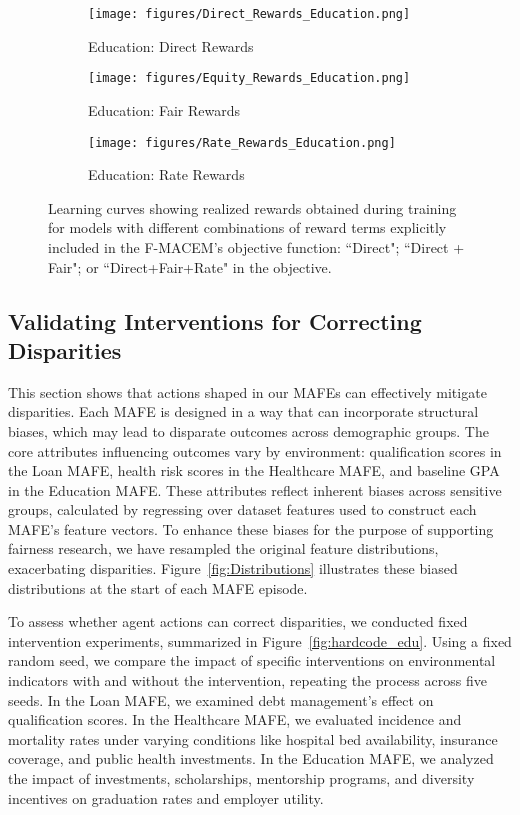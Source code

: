 \begin{figure*}[ht!]
  \begin{subfigure}{0.28\textwidth}
    \texttt{[image: figures/Direct\_Rewards\_Education.png]}
    \caption{Education: Direct Rewards} \label{fig:Direct_Rewards_Education}
  \end{subfigure}%
  \hspace{0.05\textwidth}
  \begin{subfigure}{0.28\textwidth}
    \texttt{[image: figures/Equity\_Rewards\_Education.png]}
    \caption{Education: Fair Rewards} \label{fig:Equity_Rewards_Education}
  \end{subfigure}%
  \hspace{0.05\textwidth}
  \begin{subfigure}{0.28\textwidth}
    \texttt{[image: figures/Rate\_Rewards\_Education.png]}
    \caption{Education: Rate Rewards} \label{fig:Rate_Rewards_Education}
  \end{subfigure}%
\caption{Learning curves showing realized rewards obtained during training for models with different combinations of reward terms explicitly included in the F-MACEM’s objective function: ``Direct"; ``Direct + Fair"; or ``Direct+Fair+Rate" in the objective.} 
\label{fig:learnability}
\vspace{-3mm}
\end{figure*}
\vspace{-2mm}
\subsection{Validating Interventions for Correcting Disparities}
\label{exp::hardcode}

This section shows that actions shaped in our MAFEs can effectively mitigate disparities. Each MAFE is designed in a way that can incorporate structural biases, which may lead to disparate outcomes across demographic groups. The core attributes influencing outcomes vary by environment: qualification scores in the Loan MAFE, health risk scores in the Healthcare MAFE, and baseline GPA in the Education MAFE. These attributes reflect inherent biases across sensitive groups, calculated by regressing over dataset features used to construct each MAFE's feature vectors. To enhance these biases for the purpose of supporting fairness research, we have resampled the original feature distributions, exacerbating disparities. Figure~\ref{fig:Distributions} illustrates these biased distributions at the start of each MAFE episode.

To assess whether agent actions can correct disparities, we conducted fixed intervention experiments, summarized in Figure~\ref{fig:hardcode_edu}. Using a fixed random seed, we compare the impact of specific interventions on environmental indicators with and without the intervention, repeating the process across five seeds. In the Loan MAFE, we examined debt management's effect on qualification scores. In the Healthcare MAFE, we evaluated incidence and mortality rates under varying conditions like hospital bed availability, insurance coverage, and public health investments. In the Education MAFE, we analyzed the impact of investments, scholarships, mentorship programs, and diversity incentives on graduation rates and employer utility.

